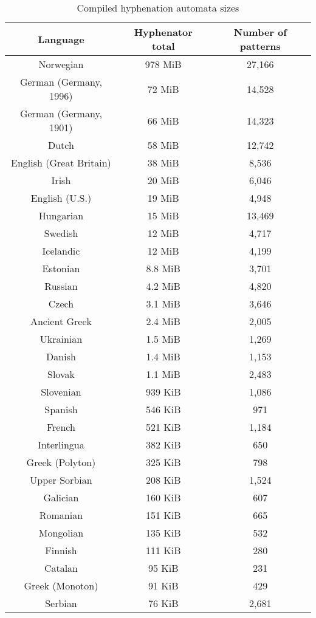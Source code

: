 \documentclass[a4paper,conference]{IEEEtran}
\begin{document}
\begin{table}[tbp]
  \caption{Compiled hyphenation automata sizes}
  \label{table:texhyph-automata}
  \centering
  \begin{tabular}{c|c|c}
    \hline
    \textbf{Language} & \textbf{Hyphenator total} & \textbf{Number of patterns} \\
    \hline
    \hline
    Norwegian & 978 MiB & 27,166 \\
    German (Germany, 1996) & 72 MiB & 14,528 \\
    German (Germany, 1901) & 66 MiB & 14,323 \\
    Dutch & 58 MiB & 12,742 \\
    English (Great Britain) & 38 MiB & 8,536 \\
    Irish & 20 MiB & 6,046\\
    English (U.S.) & 19 MiB & 4,948\\
    Hungarian & 15 MiB &  13,469 \\
    Swedish & 12 MiB & 4,717 \\
    Icelandic & 12 MiB & 4,199\\
    Estonian & 8.8 MiB & 3,701\\
    Russian & 4.2 MiB & 4,820\\
    Czech & 3.1 MiB & 3,646\\
    Ancient Greek & 2.4 MiB & 2,005\\
    Ukrainian & 1.5 MiB & 1,269\\
    Danish & 1.4 MiB & 1,153\\
    Slovak & 1.1 MiB & 2,483\\
    Slovenian & 939 KiB & 1,086\\
    Spanish & 546 KiB & 971\\
    French & 521 KiB & 1,184\\
    Interlingua & 382 KiB & 650\\
    Greek (Polyton) & 325 KiB & 798\\
    Upper Sorbian & 208 KiB & 1,524 \\
    Galician & 160 KiB & 607 \\
    Romanian & 151 KiB & 665 \\
    Mongolian & 135 KiB & 532 \\
    Finnish & 111 KiB & 280\\
    Catalan & 95 KiB & 231 \\
    Greek (Monoton) & 91 KiB & 429\\
    Serbian & 76 KiB & 2,681 \\

\end{tabular}
\end{table}
\end{document}
